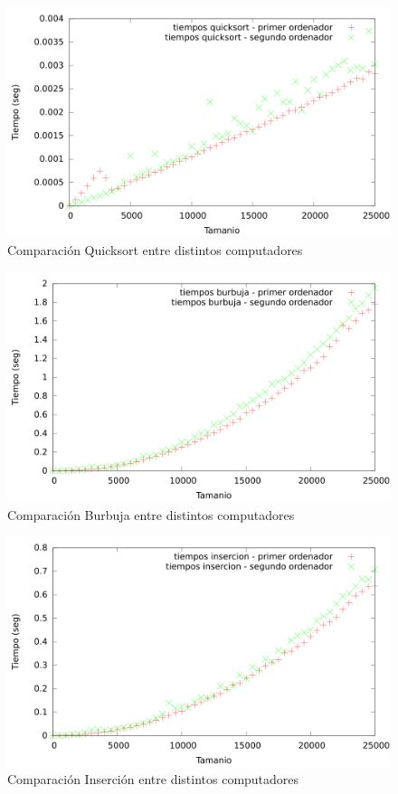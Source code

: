 \documentclass{article}
\begin{document}
	\begin{figure}[h]
		\centering
		\includegraphics[totalheight=8cm]{img/compQuicksort}
		\caption{Comparación Quicksort entre distintos computadores}
		\label{fig:compQuicksort}
	\end{figure}
	
	\begin{figure}[h]
		\centering
		\includegraphics[totalheight=8cm]{img/compBurbuja}
		\caption{Comparación Burbuja entre distintos computadores}
		\label{fig:compBurbuja}
	\end{figure}
	
	\begin{figure}[h]
		\centering
		\includegraphics[totalheight=8cm]{img/compInsercion}
		\caption{Comparación Inserción entre distintos computadores}
		\label{fig:compInsercion}
	\end{figure}
	
\end{document}

